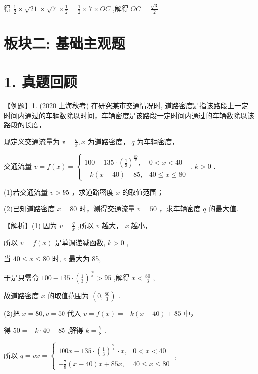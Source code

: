 \documentclass[10pt]{article}
\begin{document}
得 \(\frac{1}{2} \times  \sqrt{21} \times  \sqrt{7} \times  \frac{1}{2} = \frac{1}{2} \times  7 \times  {OC}\) ,解得 \({OC} = \frac{\sqrt{3}}{2}\)

\section*{板块二: 基础主观题}

\section*{1. 真题回顾}

【例题】1. (2020 上海秋考) 在研究某市交通情况时, 道路密度是指该路段上一定时间内通过的车辆数除以时间，车辆密度是该路段一定时间内通过的车辆数除以该路段的长度，

现定义交通流量为 \(v = \frac{q}{x},x\) 为道路密度， \(q\) 为车辆密度，

交通流量 \(v = f\left( x\right)  = \left\{  \begin{array}{ll} {100} - {135} \cdot  {\left( \frac{1}{3}\right) }^{\frac{80}{x}}, & 0 < x < {40} \\   - k\left( {x - {40}}\right)  + {85}, & {40} \leq  x \leq  {80} \end{array}\right.\) , \(k > 0\) .

(1)若交通流量 \(v > {95}\) ，求道路密度 \(x\) 的取值范围；

(2)已知道路密度 \(x = {80}\) 时，测得交通流量 \(v = {50}\) ，求车辆密度 \(q\) 的最大值.

【解析】(1) 因为 \(v = \frac{q}{x}\) ,所以 \(v\) 越大， \(x\) 越小，

所以 \(v = f\left( x\right)\) 是单调递减函数, \(k > 0\) ,

当 \({40} \leq  x \leq  {80}\) 时, \(v\) 最大为 85,

于是只需令 \({100} - {135} \cdot  {\left( \frac{1}{3}\right) }^{\frac{80}{x}} > {95}\) ,解得 \(x < \frac{80}{3}\) ,

故道路密度 \(x\) 的取值范围为 \(\left( {0,\frac{80}{3}}\right)\) .

(2)把 \(x = {80},v = {50}\) 代入 \(v = f\left( x\right)  =  - k\left( {x - {40}}\right)  + {85}\) 中，

得 \({50} =  - k \cdot  {40} + {85}\) ,解得 \(k = \frac{7}{8}\) .

所以 \(q = {vx} = \left\{  \begin{array}{ll} {100x} - {135} \cdot  {\left( \frac{1}{3}\right) }^{\frac{80}{x}} \cdot  x, & 0 < x < {40} \\   - \frac{7}{8}\left( {x - {40}}\right) x + {85x}, & {40} \leq  x \leq  {80} \end{array}\right.\) ,
\end{document}
